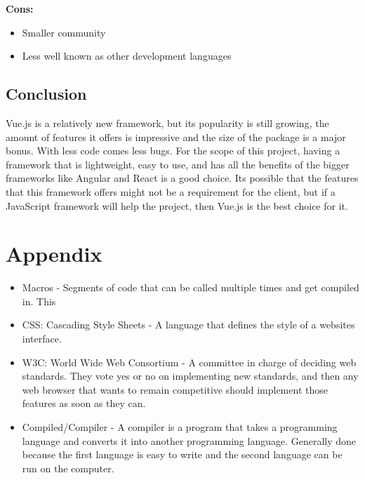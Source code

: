 \documentclass[draftclsnofoot,onecolumn,letterpaper,10pt,compsoc]{IEEEtran}
\begin{document}
    \textbf{Cons:}
    \begin{itemize}
      \item Smaller community
      \item Less well known as other development languages
    \end{itemize}

  \subsection{Conclusion}
  Vue.js is a relatively new framework, but its popularity is still growing, the amount of features it offers is impressive and the size of the package is a major bonus.
  With less code comes less bugs.
  For the scope of this project, having a framework that is lightweight, easy to use, and has all the benefits of the bigger frameworks like Angular and React is a good choice.
  Its possible that the features that this framework offers might not be a requirement for the client, but if a JavaScript framework will help the project, then Vue.js is the best choice for it.

\section{Appendix}

\begin{itemize}
  \item Macros - Segments of code that can be called multiple times and get compiled in. This
  \item CSS: Cascading Style Sheets - A language that defines the style of a websites interface.
  \item W3C: World Wide Web Consortium - A committee in charge of deciding web standards. They vote yes or no on implementing new standards, and then any web browser that wants to remain competitive should implement those features as soon as they can.
  \item Compiled/Compiler - A compiler is a program that takes a programming language and converts it into another programming language. Generally done because the first language is easy to write and the second language can be run on the computer.
\end{itemize}


\clearpage


{}

\end{document}
